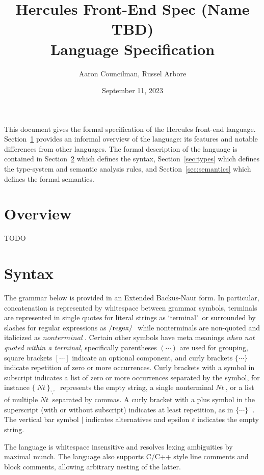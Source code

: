 \documentclass[letterpaper]{article}
\title{Hercules Front-End Spec (Name TBD) \\ \large Language Specification}
\author{Aaron Councilman, Russel Arbore}
\date{September 11, 2023}
\newcommand{\nonterminal}[1]{#1\ }
\newcommand{\terminal}[1]{\text{`#1'}\ }
\newcommand{\regex}[1]{\text{\lstinline$/#1/$}\ }
\newcommand*{\gramRepeat}[2][]{\{\ #2\}_{#1}\ }
\begin{document}
\maketitle

This document gives the formal specification of the Hercules front-end language.
Section~\ref{sec:overview} provides an informal overview of the language: its features and notable differences from other languages.
The formal description of the language is contained in Section~\ref{sec:syntax} which defines the syntax, Section~\ref{sec:types} which defines the type-system and semantic analysis rules, and Section~\ref{sec:semantics} which defines the formal semantics.

\section{Overview}\label{sec:overview}
TODO

\section{Syntax}\label{sec:syntax}
The grammar below is provided in an Extended Backus-Naur form.
In particular, concatenation is represented by whitespace between grammar symbols, terminals are represented in single quotes for literal strings as $\terminal{terminal}$ or surrounded by slashes for regular expressions as $\regex{regex}$ while nonterminals are non-quoted and italicized as $\nonterminal{nonterminal}$.
Certain other symbols have meta meanings \emph{when not quoted within a terminal}, specifically parentheses $(\cdots)$ are used for grouping, square brackets $[\cdots]$ indicate an optional component, and curly brackets $\{ \cdots \}$ indicate repetition of zero or more occurrences.
Curly brackets with a symbol in subscript indicates a list of zero or more occurrences separated by the symbol, for instance $\gramRepeat[\terminal{,}]{\nonterminal{Nt}}$ represents the empty string, a single nonterminal $\nonterminal{Nt}$, or a list of multiple $\nonterminal{Nt}$ separated by commas.
A curly bracket with a plus symbol in the superscript (with or without subscript) indicates at least repetition, as in $\{ \cdots \}^{+}$.
The vertical bar symbol $\mid$ indicates alternatives and epsilon $\varepsilon$ indicates the empty string.

The language is whitespace insensitive and resolves lexing ambiguities by maximal munch.
The language also supports C/C++ style line comments and block comments, allowing arbitrary nesting of the latter.
\end{document}
